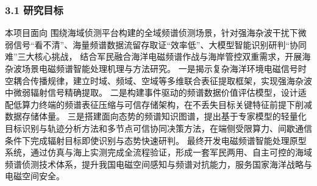 \subsubsection{3.1 研究目标}


本项目面向
围绕海域侦测平台构建的全域频谱侦测场景，针对强海杂波干扰下微弱信号“看不清”、海量频谱数据流留存取证“效率低”、大模型智能识别研判“协同难”三大核心挑战，
结合军民融合海洋电磁频谱作战与海岸管控双重需求，开展海杂波场景电磁频谱智能处理机理与方法研究。
一是揭示复杂海洋环境电磁信号时空耦合传播规律，建立时域、频域、空域等多维联合表征提取框架，实现强海杂波中微弱辐射信号精确提取。
二是构建事件驱动的频谱数据价值评估模型，设计适配低算力终端的频谱表征压缩与可信存储架构，在不丢失目标关键特征前提下削减数据存储体量。
三是搭建面向态势的频谱知识图谱，提出基于专家模型的轻量化目标识别与轨迹分析方法和多节点可信协同决策方法，在端侧受限算力、间歇通信条件下完成辐射目标即使识别与态势快速研判。
最终开发电磁频谱智能处理原型系统，通过仿真与海上实测完成全流程验证，形成一套军民两用、自主可控的海域频谱侦测技术体系，提升我国电磁空间感知与频谱对抗能力，服务国家海洋战略与电磁空间安全。